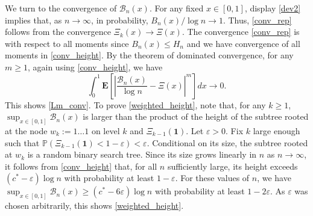\documentclass{amsart}       %
\newcommand{\E}[1]{\ensuremath{\mathbf{E} \left[#1 \right]}}
\newcommand{\Prob}[1]{\ensuremath{\mathbb{P} \left(#1 \right)}}
\begin{document}
We  turn to the convergence of $\mathcal{B}_n(x)$. For any fixed $x \in [0,1]$,
display \eqref{dev2} implies  that, as $n \to \infty$, in probability, $B_n(x) / \log n \to 1$. Thus, \eqref{conv_rep} follows from the convergence $\Xi_k(x) \to \Xi(x)$. 
 The convergence \eqref{conv_rep} is with respect to all moments since $B_n(x) \leq H_n$ and we have convergence of all moments in \eqref{conv_height}. By the theorem of dominated convergence, for any $m \geq 1$,
again using \eqref{conv_height}, we have
$$\int_0^1 \E {\left| \frac{\mathcal B_n(x)}{\log n} - \Xi(x) \right|^m} dx \to 0. $$
This shows \eqref{Lm_conv}. To prove \eqref{weighted_height}, note that, for any $k \geq 1$, $\sup_{x \in [0,1]} \mathcal B_n(x)$ is larger than the product of the height of the subtree rooted at the node $w_k := 1\ldots 1$ on level $k$ 
and $\Xi_{k-1}(\mathbf 1)$. Let $\varepsilon > 0$. Fix $k$ large enough such that $\Prob{\Xi_{k-1}(\mathbf 1) < 1-\varepsilon} < \varepsilon$. Conditional on its size, the subtree rooted at $w_k$ is a random 
binary search tree. Since its size grows linearly in $n$ as $n \to \infty$, it follows from \eqref{conv_height} that, for all $n$ sufficiently large, its height exceeds $(c^*-\varepsilon) \log n$ with probability at least
$1-\varepsilon$. For these values of $n$, we have $\sup_{x \in [0,1]} \mathcal B_n(x) \geq (c^* - 6 \varepsilon) \log n$ with probability at least $1-2 \varepsilon$. 
As $\varepsilon$ was chosen arbitrarily, this shows \eqref{weighted_height}.
\end{document}
